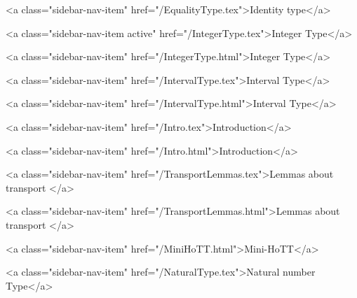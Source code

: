       
        
          <a class="sidebar-nav-item" href="/EqualityType.tex">Identity type</a>
        
      
    
      
        
          <a class="sidebar-nav-item active" href="/IntegerType.tex">Integer Type</a>
        
      
    
      
        
          <a class="sidebar-nav-item" href="/IntegerType.html">Integer Type</a>
        
      
    
      
        
          <a class="sidebar-nav-item" href="/IntervalType.tex">Interval Type</a>
        
      
    
      
        
          <a class="sidebar-nav-item" href="/IntervalType.html">Interval Type</a>
        
      
    
      
        
          <a class="sidebar-nav-item" href="/Intro.tex">Introduction</a>
        
      
    
      
        
          <a class="sidebar-nav-item" href="/Intro.html">Introduction</a>
        
      
    
      
        
          <a class="sidebar-nav-item" href="/TransportLemmas.tex">Lemmas about transport </a>
        
      
    
      
        
          <a class="sidebar-nav-item" href="/TransportLemmas.html">Lemmas about transport </a>
        
      
    
      
        
          <a class="sidebar-nav-item" href="/MiniHoTT.html">Mini-HoTT</a>
        
      
    
      
        
          <a class="sidebar-nav-item" href="/NaturalType.tex">Natural number Type</a>
        
      
    
